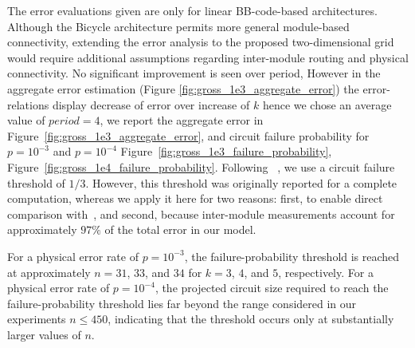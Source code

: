 \documentclass[sigconf]{acmart}
\begin{document}
The error evaluations given are only for linear BB-code-based architectures. Although the Bicycle architecture permits more general module-based connectivity, extending the error analysis to the proposed two-dimensional grid would require additional assumptions regarding inter-module routing and physical connectivity. No significant improvement is seen over period, However in the aggregate error estimation (Figure \ref{fig:gross_1e3_aggregate_error}) the error-relations display decrease of error over increase of $k$ hence we chose an average value of $\textit{period}=4$, we report the aggregate error in Figure~\ref{fig:gross_1e3_aggregate_error}, and circuit failure probability for $p = 10^{-3}$ and $p = 10 ^{-4}$ Figure~\ref{fig:gross_1e3_failure_probability}, Figure~\ref{fig:gross_1e4_failure_probability}. Following ~\cite[Section~4]{tourdegross}, we use a circuit failure threshold of $1/3$. However, this threshold was originally reported for a complete computation, whereas we apply it here for two reasons: first, to enable direct comparison with~\cite{tourdegross}, and second, because inter-module measurements account for approximately $97\%$ of the total error in our model.

For a physical error rate of $p=10^{-3}$, the failure-probability threshold is reached at approximately $n=31$, $33$, and $34$ for $k=3$, $4$, and $5$, respectively.  For a physical error rate of $p=10^{-4}$, the projected circuit size required to reach the failure-probability threshold lies far beyond the range considered in our experiments $n \leq 450$, indicating that the threshold occurs only at substantially larger values of $n$.


\end{document}

